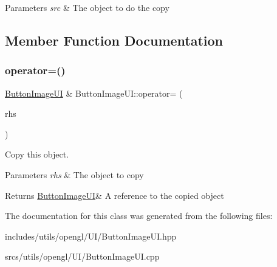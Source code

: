 \begin{DoxyParams}{Parameters}
{\em src} & The object to do the copy \\
\hline
\end{DoxyParams}


\subsection{Member Function Documentation}
\mbox{\label{class_button_image_u_i_a1915cfb56b96a85b1c0fad64508fe9f3}} 
\subsubsection{\texorpdfstring{operator=()}{operator=()}}
{\footnotesize\ttfamily \hyperlink{class_button_image_u_i}{Button\+Image\+UI} \& Button\+Image\+U\+I\+::operator= (\begin{DoxyParamCaption}\item[{\hyperlink{class_button_image_u_i}{Button\+Image\+UI} const \&}]{rhs }\end{DoxyParamCaption})}



Copy this object. 


\begin{DoxyParams}{Parameters}
{\em rhs} & The object to copy \\
\hline
\end{DoxyParams}
\begin{DoxyReturn}{Returns}
\hyperlink{class_button_image_u_i}{Button\+Image\+UI}\& A reference to the copied object 
\end{DoxyReturn}


The documentation for this class was generated from the following files\+:\begin{DoxyCompactItemize}
\item 
includes/utils/opengl/\+U\+I/Button\+Image\+U\+I.\+hpp\item 
srcs/utils/opengl/\+U\+I/Button\+Image\+U\+I.\+cpp\end{DoxyCompactItemize}
